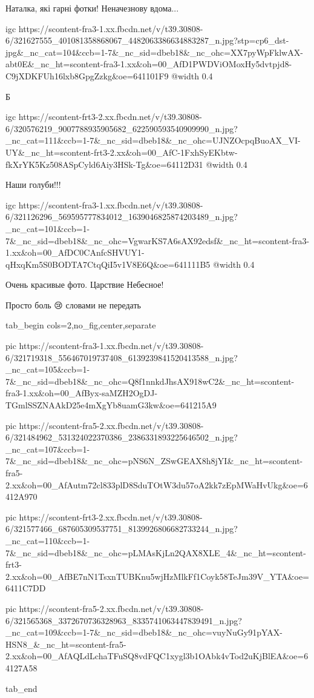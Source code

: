 
Наталка, які гарні фотки! Неначезнову вдома...


\ifcmt
  igc https://scontent-fra3-1.xx.fbcdn.net/v/t39.30808-6/321627555_401081358868067_4482063386634883287_n.jpg?stp=cp6_dst-jpg&_nc_cat=104&ccb=1-7&_nc_sid=dbeb18&_nc_ohc=XX7pyWpFklwAX-abt0E&_nc_ht=scontent-fra3-1.xx&oh=00_AfD1PWDViOMoxHy5dvtpjd8-C9jXDKFUh16lxb8GpgZzkg&oe=641101F9
  @width 0.4
\fi


Б

\ifcmt
  igc https://scontent-frt3-2.xx.fbcdn.net/v/t39.30808-6/320576219_9007788935905682_622590593540909990_n.jpg?_nc_cat=111&ccb=1-7&_nc_sid=dbeb18&_nc_ohc=UJNZOcpqBuoAX_VI-UY&_nc_ht=scontent-frt3-2.xx&oh=00_AfC-1FxhSyEKbtw-fkXrYK5Kz508ASpCyld6Aiy3HSk-Tg&oe=64112D31
  @width 0.4
\fi


Наши голуби!!!

\ifcmt
  igc https://scontent-fra3-1.xx.fbcdn.net/v/t39.30808-6/321126296_569595777834012_1639046825874203489_n.jpg?_nc_cat=101&ccb=1-7&_nc_sid=dbeb18&_nc_ohc=VgwarKS7A6sAX92edsf&_nc_ht=scontent-fra3-1.xx&oh=00_AfDC0CAnfcSHVUY1-qHxqKm5S0BODTA7CtqQiI5v1V8E6Q&oe=641111B5
  @width 0.4
\fi


Очень красивые фото. Царствие Небесное!


Просто боль 😢 словами не передать

\begin{center}
\begin{minipage}{\textwidth}

\ifcmt
  tab_begin cols=2,no_fig,center,separate

     pic https://scontent-fra3-1.xx.fbcdn.net/v/t39.30808-6/321719318_556467019737408_6139239841520413588_n.jpg?_nc_cat=105&ccb=1-7&_nc_sid=dbeb18&_nc_ohc=Q8f1nnkdJhsAX918wC2&_nc_ht=scontent-fra3-1.xx&oh=00_AfByx-saMZH2OgDJ-TGmlSSZNAAkD25e4mXgYb8uamG3kw&oe=641215A9

     pic https://scontent-fra5-2.xx.fbcdn.net/v/t39.30808-6/321484962_531324022370386_2386331893225646502_n.jpg?_nc_cat=107&ccb=1-7&_nc_sid=dbeb18&_nc_ohc=pNS6N_ZSwGEAX8h8jYI&_nc_ht=scontent-fra5-2.xx&oh=00_AfAutm72cl833plD8SduTOtW3du57oA2kk7zEpMWaHvUkg&oe=6412A970

     pic https://scontent-frt3-2.xx.fbcdn.net/v/t39.30808-6/321577466_687605309537751_8139926806682733244_n.jpg?_nc_cat=110&ccb=1-7&_nc_sid=dbeb18&_nc_ohc=pLMAsKjLn2QAX8XLE_4&_nc_ht=scontent-frt3-2.xx&oh=00_AfBE7nN1TsxnTUBKnu5wjHzMlkFf1Coyk58TeJm39V_YTA&oe=6411C7DD

     pic https://scontent-fra5-2.xx.fbcdn.net/v/t39.30808-6/321565368_3372670736328963_8335741063447839491_n.jpg?_nc_cat=109&ccb=1-7&_nc_sid=dbeb18&_nc_ohc=vuyNuGy91pYAX-HSN8_&_nc_ht=scontent-fra5-2.xx&oh=00_AfAQLdLchaTFuSQ8vdFQC1xygl3b1OAbk4vTod2uKjBlEA&oe=64127A58

  tab_end
\fi
\end{minipage}
\end{center}

